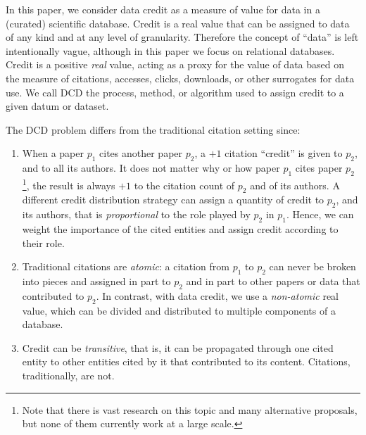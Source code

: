 In this paper, \textcolor{correction}{we consider data credit as a measure of value for data} in a (curated) scientific database.  
\textcolor{correction}{Credit is a real value that can be assigned} to data of any kind and at any level of granularity. Therefore the concept of ``data'' is left intentionally vague, although in this paper we focus on relational databases.
Credit is a positive \emph{real} value, acting as a proxy for the value of data based on the measure of citations, accesses, clicks, downloads, or other surrogates for data use. We call DCD the process, method, or algorithm used to assign credit to a given datum or dataset. 

The DCD problem differs from the traditional citation setting since: 
\begin{enumerate}
    \item \textcolor{correction}{When a paper $p_1$ cites another paper $p_2$, a $+1$ citation ``credit'' is given to $p_2$, and to all its authors. It does not matter why or how paper $p_1$ cites paper $p_2$\footnote{Note that there is vast research on this topic and many alternative proposals, but none of them currently work at a large scale.}, the result is always $+1$ to the citation count of $p_2$ and of its authors. A different credit distribution strategy can assign a quantity of credit to $p_2$, and its authors, that is \emph{proportional} to the role played by $p_2$ in $p_1$. Hence, we can weight the importance of the cited entities and assign credit according to their role.}
    \item \textcolor{correction}{Traditional citations are \emph{atomic}: a citation from $p_1$ to $p_2$ can never be broken into pieces and assigned in part to $p_2$ and in part to other papers or data that contributed to $p_2$. 
	In contrast, with data credit, we use a \emph{non-atomic} real value, which can be divided and distributed to multiple components of a database.} 
	\item Credit can be \emph{transitive}, that is, it can be propagated through one cited entity to other entities cited by it that contributed to its content. Citations, traditionally, are not. 
\end{enumerate}

